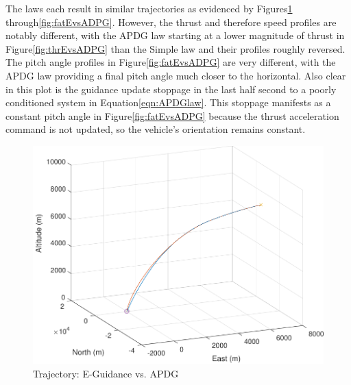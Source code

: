 The laws each result in similar trajectories as evidenced by Figures\:\ref{fig:trajEvsADPG} through\:\ref{fig:fatEvsADPG}. However, the thrust and therefore speed profiles are notably different, with the APDG law starting at a lower magnitude of thrust in Figure\:\ref{fig:thrEvsADPG} than the Simple law and their profiles roughly reversed. The pitch angle profiles in Figure\:\ref{fig:fatEvsADPG} are very different, with the APDG law providing a final pitch angle much closer to the horizontal. Also clear in this plot is the guidance update stoppage in the last half second to a poorly conditioned system in Equation\:\ref{eqn:APDGlaw}. This stoppage manifests as a constant pitch angle in Figure\:\ref{fig:fatEvsADPG} because the thrust acceleration command is not updated, so the vehicle's orientation remains constant.

\begin{figure}[H]
	\centering
	\begin{minipage}{4.5 in}
		\includegraphics[width=\linewidth]{Figures/trajEvsADPG.pdf}
		\caption{Trajectory: E-Guidance vs. APDG \label{fig:trajEvsADPG} }
	\end{minipage}
\end{figure}


